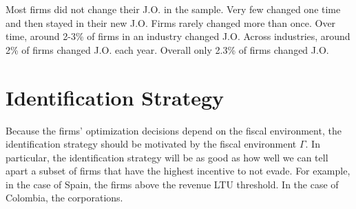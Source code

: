 \documentclass[
  12pt]{article}
\theoremstyle{definition}
\theoremstyle{remark}
\begin{document}
Most firms did not change their J.O. in the sample. Very few changed one
time and then stayed in their new J.O. Firms rarely changed more than
once. Over time, around 2-3\% of firms in an industry changed J.O.
Across industries, around 2\% of firms changed J.O. each year. Overall
only 2.3\% of firms changed J.O.

\begin{table}

\caption{\label{tbl-jo-change}Changes of Juridical Organization per Firm
(percentage) by year and top five biggest industries.}


\end{table}%

\section{Identification Strategy}\label{identification-strategy}

Because the firms' optimization decisions depend on the fiscal
environment, the identification strategy should be motivated by the
fiscal environment \(\Gamma\). In particular, the identification
strategy will be as good as how well we can tell apart a subset of firms
that have the highest incentive to not evade. For example, in the case
of Spain, the firms above the revenue LTU threshold. In the case of
Colombia, the corporations.
\end{document}
